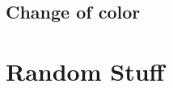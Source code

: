 \documentclass[a4paper,10pt
,draft
]{article}%
\renewcommand{\1}{\eta}%
\begin{document}


\subsection{Change of color}




\section{Random Stuff}
\end{document}
